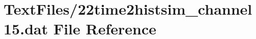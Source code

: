 \hypertarget{22time2histsim__channel15_8dat}{}\section{Text\+Files/22time2histsim\+\_\+channel15.dat File Reference}
\label{22time2histsim__channel15_8dat}
